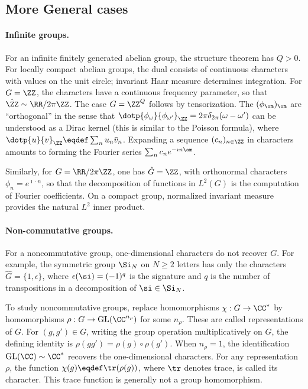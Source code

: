 \subsection{More General cases}

\paragraph{Infinite groups.}

For an infinite finitely generated abelian group, the structure theorem has $Q>0$. For locally compact abelian groups, the dual consists of continuous characters with values on the unit circle; invariant Haar measure determines integration. For $G=\ZZ$, the characters have a continuous frequency parameter,
so that $\hat \ZZ \sim \RR/2\pi\ZZ$.
%
The case $G=\ZZ^Q$ follows by tensorization. 
%
The $(\phi_\om)_\om$ are ``orthogonal'' in the sense that $\dotp{\phi_\omega}{\phi_{\omega'}}_\ZZ=2\pi\delta_{2\pi}(\omega-\omega')$ can be understood as a Dirac kernel (this is similar to the Poisson formula), where $\dotp{u}{v}_\ZZ \eqdef \sum_n u_n \bar v_n$.
%
Expanding a sequence $(c_n)_{n \in \ZZ}$ in characters amounts to forming the Fourier series $\sum_n c_n e^{-\imath n \om}$.

Similarly, for $G=\RR/2\pi\ZZ$, one has $\hat G=\ZZ$, with orthonormal characters $\phi_n=e^{\imath \cdot n}$, so that the decomposition of functions in $L^2(G)$ is the computation of Fourier coefficients.
%
On a compact group, normalized invariant measure provides the natural $L^2$ inner product.

\paragraph{Non-commutative groups.}
 
For a noncommutative group, one-dimensional characters do not recover $G$. For example, the symmetric group $\Si_N$ on $N\geq2$ letters has only the characters $\hat G=\{1,\epsilon\}$, where $\epsilon(\si) = (-1)^{q}$ is the signature and $q$ is the number of transpositions in a decomposition of $\si \in \Si_N$.

To study noncommutative groups, replace homomorphisms $\chi : G \rightarrow \CC^*$ by homomorphisms $\rho : G \rightarrow \text{GL}(\CC^{n_\rho})$ for some $n_\rho$. These are called representations of $G$. For $(g,g') \in G$, writing the group operation multiplicatively on $G$, the defining identity is $\rho(gg')=\rho(g) \circ \rho(g')$. When $n_\rho=1$, the identification $\text{GL}(\CC) \sim \CC^*$ recovers the one-dimensional characters. For any representation $\rho$, the function $\chi(g) \eqdef \tr(\rho(g))$, where $\tr$ denotes trace, is called its character. This trace function is generally not a group homomorphism.

